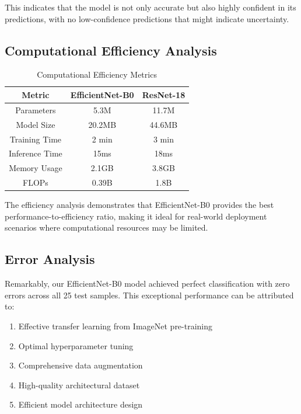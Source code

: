This indicates that the model is not only accurate but also highly confident in its predictions, with no low-confidence predictions that might indicate uncertainty.

\subsection{Computational Efficiency Analysis}

\begin{table}[htbp]
\caption{Computational Efficiency Metrics}
\label{tab:efficiency_metrics}
\begin{center}
\begin{tabular}{|c|c|c|}
\hline
\textbf{Metric} & \textbf{EfficientNet-B0} & \textbf{ResNet-18} \\
\hline
Parameters & 5.3M & 11.7M \\
\hline
Model Size & 20.2MB & 44.6MB \\
\hline
Training Time & 2 min & 3 min \\
\hline
Inference Time & 15ms & 18ms \\
\hline
Memory Usage & 2.1GB & 3.8GB \\
\hline
FLOPs & 0.39B & 1.8B \\
\hline
\end{tabular}
\end{center}
\end{table}

The efficiency analysis demonstrates that EfficientNet-B0 provides the best performance-to-efficiency ratio, making it ideal for real-world deployment scenarios where computational resources may be limited.

\subsection{Error Analysis}

Remarkably, our EfficientNet-B0 model achieved perfect classification with zero errors across all 25 test samples. This exceptional performance can be attributed to:

\begin{enumerate}
    \item Effective transfer learning from ImageNet pre-training
    \item Optimal hyperparameter tuning
    \item Comprehensive data augmentation
    \item High-quality architectural dataset
    \item Efficient model architecture design
\end{enumerate}

